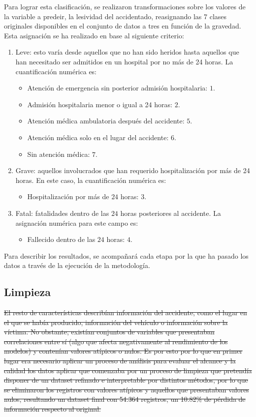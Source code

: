 \documentclass{uathesis-es}
\begin{document}
{	Para lograr esta clasificación, se realizaron transformaciones sobre los valores de la variable a predeir, la lesividad del accidentado, reasignando las 7 clases originales disponibles en el conjunto de datos a tres en función de la gravedad. Esta asignación se ha realizado en base al siguiente criterio:
	
	\begin{enumerate}
		\item Leve: esto varía desde aquellos que no han sido heridos hasta aquellos que han necesitado ser admitidos en un hospital por no más de 24 horas. La cuantificación numérica es:
		\begin{itemize}
			\item Atención de emergencia sin posterior admisión hospitalaria: $1$.
			\item Admisión hospitalaria menor o igual a 24 horas: $2$.
			\item Atención médica ambulatoria después del accidente: $5$.
			\item Atención médica solo en el lugar del accidente: $6$.
			\item Sin atención médica: $7$.
		\end{itemize}
		\item Grave: aquellos involucrados que han requerido hospitalización por más de 24 horas. En este caso, la cuantificación numérica es:
		\begin{itemize}
			\item Hospitalización por más de $24$ horas: $3$.
		\end{itemize}
		\item Fatal: fatalidades dentro de las $24$ horas posteriores al accidente. La asignación numérica para este campo es:
		\begin{itemize}
			\item Fallecido dentro de las $24$ horas: $4$.
		\end{itemize}
	\end{enumerate}
	
	Para describir los resultados, se acompañará cada etapa por la que ha pasado los datos a través de la ejecución de la metodología.
	
	\subsection*{Limpieza}
	
	\sout{El resto de características describían información del accidente, como el lugar en el que se había producido, información del vehículo o información sobre la víctima. No obstante, existían conjuntos de variables que presentaban correlaciones entre sí (algo que afecta negativamente al rendimiento de los modelos) y contenían valores atípicos o nulos. Es por esto por lo que en primer lugar era necesario aplicar un proceso de análisis para evaluar el alcance y la calidad los datos aplicar que comenzaba por un proceso de limpieza que pretendía disponer de un dataset refinado e interpretable por distintos métodos, por lo que se eliminaron los registros con valores atípicos y aquellos que presentaban valores nulos, resultando un dataset final con 54.364 registros, un 10.82\% de pérdida de información respecto al original.}
	
}
\end{document}
